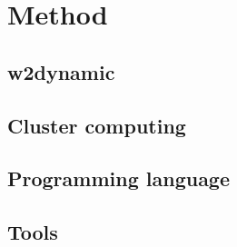 \chapter{Method}
\label{ch:method}

\section{w2dynamic}

\section{Cluster computing}

\section{Programming language}

\section{Tools}

